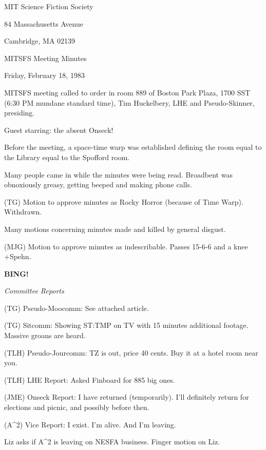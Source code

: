 \documentclass[12pt]{article}
\newcommand{\bing}{{\bf BING!} }
\newcommand{\goto}[1]{\bing \vskip 12pt \centerline{{\em{#1}}}}
\begin{document}
\begin{center}

MIT Science Fiction Society 

84 Massachusetts Avenue

Cambridge, MA 02139

\vspace{12pt}

MITSFS Meeting Minutes 

Friday, February 18, 1983

\end{center}
 
\vspace{18pt}

\setlength{\parskip}{6pt}

\noindent
MITSFS meeting called to order in room 889 of Boston Park Plaza, 1700 SST (6:30 PM mundane standard time),
Tim Huckelbery, LHE and Pseudo-Skinner, presiding.

Guest starring: the absent Onseck!

Before the meeting, a space-time warp was established defining the room equal to the Library equal to the Spofford room.

Many people came in while the minutes were being read. Broadbent was obnoxiously greasy, getting beeped and making phone calls.

(TG) Motion to approve minutes as Rocky Horror (because of Time Warp). Withdrawn.

Many motions concerning minutes made and killed by general disgust.

(MJG) Motion to approve minutes as indescribable. Passes 15-6-6 and a knee +Spehn.

\goto{Committee Reports}

(TG) Pseudo-Moocomm: See attached article.

(TG) Sitcomm: Showing ST:TMP on TV with 15 minutes additional footage. Massive groans are heard.

(TLH) Pseudo-Jourcomm: TZ is out, price 40 cents. Buy it at a hotel room near you.

(TLH) LHE Report: Asked Finboard for 885 big ones.

(JME) Onseck Report: I have returned (temporarily). I'll definitely return for elections and picnic, and possibly before then.

(A^2) Vice Report: I exist. I'm alive. And I'm leaving.

Liz asks if A^2 is leaving on NESFA business. Finger motion on Liz.
\end{document}
